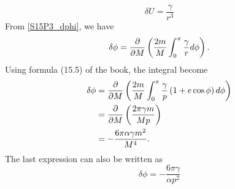 \begin{subproblem}
{
\begin{equation*}
    \delta U = \frac{\gamma}{r^3}
\end{equation*}
}
{
From \eqref{S15P3_dphi}, we have
\begin{equation*}
     \delta \phi = \frac{\partial }{\partial M}\left( \frac{2m}{M} \int_0^\pi \frac{\gamma}{r}d\phi \right).
\end{equation*}
Using formula (15.5) of the book, the integral become
\begin{align*}
    \delta \phi &= \frac{\partial }{\partial M}\left( \frac{2m}{M} \int_0^\pi \frac{\gamma}{p}\left(1+e\cos\phi\right)d\phi \right) \\
    &= \frac{\partial }{\partial M}\left( \frac{2\pi\gamma m}{Mp} \right) \\
    &= -\frac{6\pi\alpha\gamma m^2}{M^4}.
\end{align*}
The last expression can also be written as
}
{
\begin{equation*}
    \delta \phi = -\frac{6\pi\gamma}{\alpha p^2}
\end{equation*}
}
\end{subproblem}
